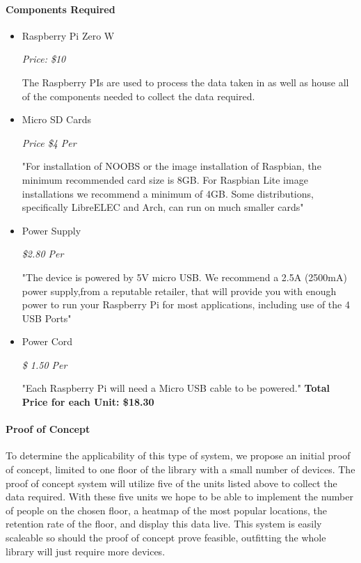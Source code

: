 \documentclass[12pt]{article}
\begin{document}
\paragraph{Components Required}
\begin{itemize}
  \item Raspberry Pi Zero W
  \par
  \textit{Price: \$10}
  \par
  The Raspberry PIs are used to process the data taken in as well as house all of the components needed to collect the data required.
  \item Micro SD Cards
  \par
  \textit{Price \$4 Per}
  \par
  "For installation of NOOBS or the image installation of Raspbian, the minimum recommended card size is 8GB.  For Raspbian Lite image installations we recommend a minimum of 4GB.  Some distributions, specifically LibreELEC and Arch, can run on much smaller cards"

  \item Power Supply
  \par
  \textit{\$2.80 Per}
  \par
  "The device is powered by 5V micro USB.  We recommend a 2.5A (2500mA) power supply,from a reputable retailer, that will provide you with enough power to run your Raspberry Pi for most applications, including use of the 4 USB Ports"
  
  \item Power Cord
  \par
  \textit{\$ 1.50 Per}
  \par
  \par"Each Raspberry Pi will need a Micro USB cable to be powered."
  \textbf{Total Price for each Unit: \$18.30}
\end{itemize}

\paragraph{Proof of Concept}
To determine the applicability of this type of system, we propose an initial proof of concept, limited to one floor of the library with a small number of devices. The proof of concept system will utilize five of the units listed above to collect the data required.  With these five units we hope to be able to implement the number of people on the chosen floor, a heatmap of the most popular locations, the retention rate of the floor, and display this data live.  This system is easily scaleable so should the proof of concept prove feasible, outfitting the whole library will just require more devices. 
\end{document}
